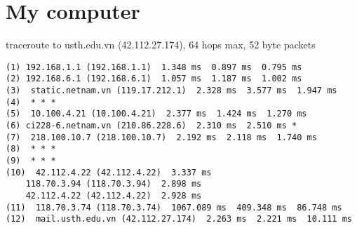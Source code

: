 \documentclass{article}
\begin{document}
\section{My computer}
traceroute to usth.edu.vn (42.112.27.174), 64 hops max, 52 byte packets
\begin{lstlisting}
(1) 192.168.1.1 (192.168.1.1)  1.348 ms  0.897 ms  0.795 ms
(2) 192.168.6.1 (192.168.6.1)  1.057 ms  1.187 ms  1.002 ms
(3)  static.netnam.vn (119.17.212.1)  2.328 ms  3.577 ms  1.947 ms
(4)  * * *
(5)  10.100.4.21 (10.100.4.21)  2.377 ms  1.424 ms  1.270 ms
(6) ci228-6.netnam.vn (210.86.228.6)  2.310 ms  2.510 ms *
(7)  218.100.10.7 (218.100.10.7)  2.192 ms  2.118 ms  1.740 ms
(8)  * * *
(9)  * * *
(10)  42.112.4.22 (42.112.4.22)  3.337 ms
    118.70.3.94 (118.70.3.94)  2.898 ms
    42.112.4.22 (42.112.4.22)  2.928 ms
(11)  118.70.3.74 (118.70.3.74)  1067.089 ms  409.348 ms  86.748 ms
(12)  mail.usth.edu.vn (42.112.27.174)  2.263 ms  2.221 ms  10.111 ms
\end{lstlisting}
\end{document}
